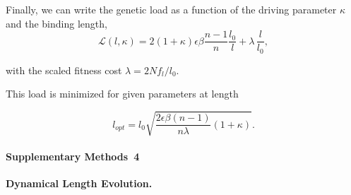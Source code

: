 \documentclass[10pt,a4paper]{article}
\begin{document}
\noindent Finally, we can write the genetic load as a function of the driving parameter $\kappa$ and the binding length,
\begin{equation}
	\mathcal{L}(l,\kappa)=2(1+\kappa)\epsilon\beta\frac{n-1}{n}\frac{l_0}{l}+\lambda\,\frac{l}{l_0},
\end{equation} 

\noindent with the scaled fitness cost $\lambda=2Nf_l/l_0$.


\noindent This load is minimized for given parameters at length

\begin{equation}
	l_{opt} = l_0\sqrt{\frac{2\epsilon\beta(n-1)}{n\lambda}(1+\kappa)}.
\end{equation}



\clearpage
\paragraph*{Supplementary Methods~4} \label{supp4}
{\bf{Dynamical Length Evolution.}}\\ \\
\end{document}
